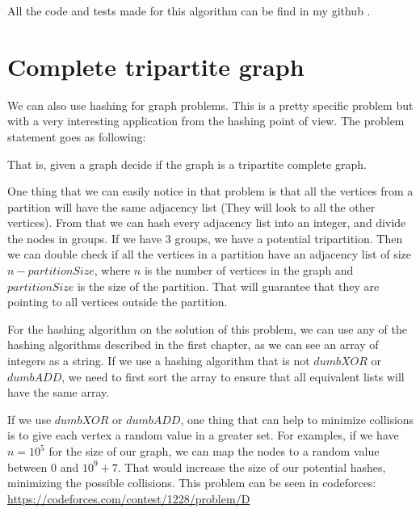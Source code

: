All the code and tests made for this algorithm can be find in my github \citep{GithubRepo}.

\section{Complete tripartite graph}

We can also use hashing for graph problems. This is a pretty specific problem but with a very interesting application from the hashing point of view. The problem statement goes as following:

\medskip


That is, given a graph decide if the graph is a tripartite complete graph. 

One thing that we can easily notice in that problem is that all the vertices from a partition will have the same adjacency list (They will look to all the other vertices). From that we can hash every adjacency list into an integer, and divide the nodes in groups. If we have 3 groups, we have a potential tripartition. Then we can double check if all the vertices in a partition have an adjacency list of size \( n - partitionSize \), where \( n \) is the number of vertices in the graph and \( partitionSize \) is the size of the partition. That will guarantee that they are pointing to all vertices outside the partition.

For the hashing algorithm on the solution of this problem, we can use any of the hashing algorithms described in the first chapter, as we can see an array of integers as a string. If we use a hashing algorithm that is not \( dumbXOR \) or \( dumbADD \), we need to first sort the array to ensure that all equivalent lists will have the same array.

If we use \( dumbXOR \) or \( dumbADD \), one thing that can help to minimize collisions is to give each vertex a random value in a greater set. For examples, if we have \( n = 10^5 \) for the size of our graph, we can map the nodes to a random value between \( 0 \) and \( 10^9 + 7 \). That would increase the size of our potential hashes, minimizing the possible collisions. This problem can be seen in codeforces: \url{https://codeforces.com/contest/1228/problem/D}

\medskip

